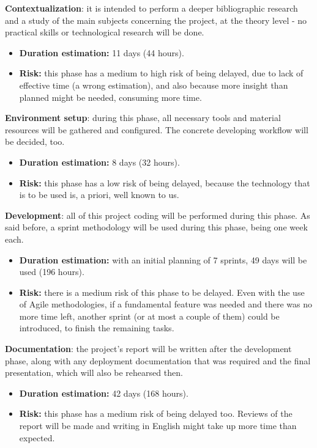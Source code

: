 \begin{enumerate}[leftmargin=1.5cm, label=\textbf{{[}Phase \arabic*{]}}]
	\item \textbf{Contextualization}: it is intended to perform a deeper bibliographic research and a study of the main subjects concerning the project, at the theory level - no practical skills or technological research will be done.
	\begin{itemize}
		\item \textbf{Duration estimation:} 11 days (44 hours).
		\item \textbf{Risk:} this phase has a medium to high risk of being delayed, due to lack of effective time (a wrong estimation), and also because more insight than planned might be needed, consuming more time.
	\end{itemize}
	
	\item \textbf{Environment setup}: during this phase, all necessary tools and material resources will be gathered and configured. The concrete developing workflow will be decided, too.
		\begin{itemize}
			\item \textbf{Duration estimation:} 8 days (32 hours).
			\item \textbf{Risk:} this phase has a low risk of being delayed, because the technology that is to be used is, a priori, well known to us.
		\end{itemize}
		
	\item \textbf{Development}: all of this project coding will be performed during this phase. As said before, a sprint methodology will be used during this phase, being one week each.
		\begin{itemize}
			\item \textbf{Duration estimation:} with an initial planning of 7 sprints, 49 days will be used (196 hours).
			\item \textbf{Risk:} there is a medium risk of this phase to be delayed. Even with the use of Agile methodologies, if a fundamental feature was needed and there was no more time left, another sprint (or at most a couple of them) could be introduced, to finish the remaining tasks.
		\end{itemize}
		
	\item \textbf{Documentation}: the project’s report will be written after the development phase, along with any deployment documentation that was required and the final presentation, which will also be rehearsed then.
		\begin{itemize}
			\item \textbf{Duration estimation:} 42 days (168 hours).
			\item \textbf{Risk:} this phase has a medium risk of being delayed too. Reviews of the report will be made and writing in English might take up more time than expected.
		\end{itemize}
	
\end{enumerate}

